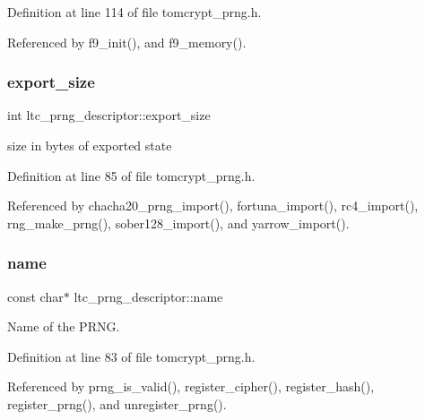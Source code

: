 Definition at line 114 of file tomcrypt\+\_\+prng.\+h.



Referenced by f9\+\_\+init(), and f9\+\_\+memory().

\mbox{\label{structltc__prng__descriptor_a41ef184ab75b213366392faabcde420c}} 
\subsubsection{\texorpdfstring{export\_size}{export\_size}}
{\footnotesize\ttfamily int ltc\+\_\+prng\+\_\+descriptor\+::export\+\_\+size}



size in bytes of exported state 



Definition at line 85 of file tomcrypt\+\_\+prng.\+h.



Referenced by chacha20\+\_\+prng\+\_\+import(), fortuna\+\_\+import(), rc4\+\_\+import(), rng\+\_\+make\+\_\+prng(), sober128\+\_\+import(), and yarrow\+\_\+import().

\mbox{\label{structltc__prng__descriptor_a56124a50c35eebe647ae285e14c0d147}} 
\subsubsection{\texorpdfstring{name}{name}}
{\footnotesize\ttfamily const char$\ast$ ltc\+\_\+prng\+\_\+descriptor\+::name}



Name of the P\+R\+NG. 



Definition at line 83 of file tomcrypt\+\_\+prng.\+h.



Referenced by prng\+\_\+is\+\_\+valid(), register\+\_\+cipher(), register\+\_\+hash(), register\+\_\+prng(), and unregister\+\_\+prng().

\mbox{\label{structltc__prng__descriptor_aa156d23f4baa6a992ce17150596c1b57}} 

